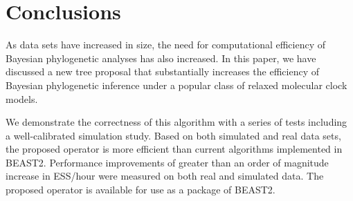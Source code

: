 \documentclass{bmcart}
\begin{document}
\section*{Conclusions}
As data sets have increased in size, the need for computational efficiency of Bayesian phylogenetic analyses has also increased. In this paper, we have discussed a new tree proposal that substantially increases the efficiency of Bayesian phylogenetic inference under a popular class of relaxed molecular clock models.

We demonstrate the correctness of this algorithm with a series of tests including a well-calibrated simulation study. Based on both simulated and real data sets, the proposed operator is more efficient than current algorithms implemented in BEAST2. Performance improvements of greater than an order of magnitude increase in ESS/hour were measured on both real and simulated data. The proposed operator is available for use as a package of BEAST2.
\end{document}
